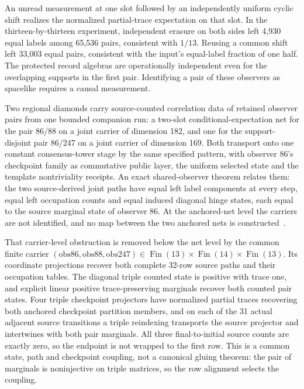 \documentclass[11pt]{article}
\theoremstyle{remark}
\theoremstyle{plain}
\begin{document}
An unread measurement at one slot followed by an independently uniform
cyclic shift realizes the normalized partial-trace expectation on that
slot. In the thirteen-by-thirteen experiment, independent erasure on
both sides left 4,930 equal labels among 65,536 pairs, consistent with
$1/13$. Reusing a common shift left 33,003 equal pairs, consistent with
the input's equal-label fraction of one half. The protected record
algebras are operationally independent even for the overlapping supports
in the first pair. Identifying a pair of these observers as spacelike
requires a causal measurement.

Two regional diamonds carry source-counted correlation data of retained
observer pairs from one bounded companion run: a two-slot
conditional-expectation net for the pair 86/88 on a joint carrier of
dimension 182, and one for the support-disjoint pair 86/247 on a joint
carrier of dimension 169. Both transport onto one constant consensus-tower
stage by the same specified pattern, with observer 86's checkpoint family as
commutative public layer, the uniform selected state and the template
nontriviality receipts. An exact shared-observer theorem relates them: the
two source-derived joint paths have equal left label components at every
step, equal left occupation counts and equal induced diagonal hinge states,
each equal to the source marginal state of observer 86. At the anchored-net
level the carriers are not identified, and no map between the two anchored
nets is constructed~\cite{ophrepo}.

That carrier-level obstruction is removed below the net level by the common
finite carrier \((\mathrm{obs86},\mathrm{obs88},\mathrm{obs247})\in
\operatorname{Fin}(13)\times\operatorname{Fin}(14)\times\operatorname{Fin}(13)\).
Its coordinate projections recover both complete 32-row source paths and
their occupation tables. The diagonal triple counted state is positive with
trace one, and explicit linear positive trace-preserving marginals recover
both counted pair states. Four triple checkpoint projectors have normalized
partial traces recovering both anchored checkpoint partition members, and
on each of the 31 actual adjacent source transitions a triple reindexing
transports the source projector and intertwines with both pair marginals.
All three final-to-initial source counts are exactly zero, so the endpoint
is not wrapped to the first row. This is a common state, path and
checkpoint coupling, not a canonical gluing theorem: the pair of marginals
is noninjective on triple matrices, so the row alignment selects the
coupling.
\end{document}
